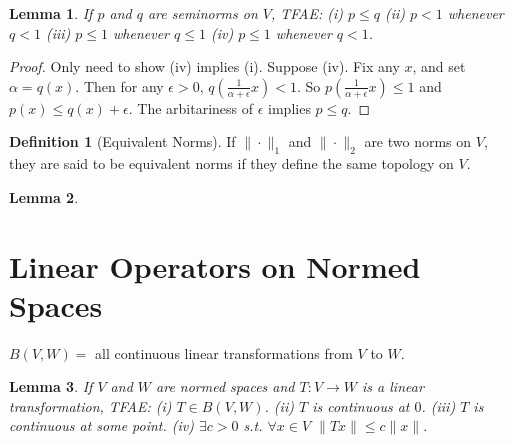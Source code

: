 \documentclass{article}
\newtheorem{lemma}{Lemma}[section]
\theoremstyle{definition}
\newtheorem{definition}{Definition}[section]
\begin{document}
\begin{lemma}
    If $p$ and $q$ are seminorms on $V$, TFAE: \newline
    (i) $p\le q$ \newline 
    (ii) $p<1$ whenever $q<1$\newline 
    (iii) $p\le 1$ whenever $q\le 1$ \newline 
    (iv) $p\le 1$ whenever $q<1$.
\end{lemma}
\begin{proof}
    Only need to show (iv) implies (i). \newline 
    Suppose (iv). Fix any $x$, and set $\alpha=q(x)$. Then for any $\epsilon>0$, $q(\frac{1}{\alpha+\epsilon}x)<1$.
    So $p(\frac{1}{\alpha+\epsilon}x)\le 1$ and $p(x)\le q(x)+\epsilon$. The arbitariness of $\epsilon$ implies $p\le q$.
\end{proof}

\begin{definition}[Equivalent Norms]
    If $\|\cdot\|_1$ and $\|\cdot\|_2$ are two norms on $V$, they are said to be equivalent norms if they define
    the same topology on $V$.
\end{definition}

\begin{lemma}
    
\end{lemma}

\section{Linear Operators on Normed Spaces}
$B(V,W)=$ all continuous linear transformations from $V$ to $W$.


\begin{lemma}
    If $V$ and $W$ are normed spaces and $T:V\to W$ is a linear transformation, TFAE:\newline 
    (i) $T\in B(V,W)$. \newline 
    (ii) $T$ is continuous at $0$. \newline 
    (iii) $T$ is continuous at some point.\newline 
    (iv) $\exists c>0$ s.t. $\forall x\in V$ $\|Tx\|\le c\|x\|$.
\end{lemma}
\end{document}
